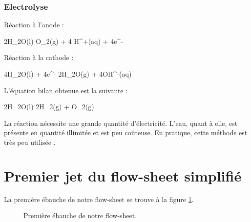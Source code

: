 \documentclass{article}
\begin{document}
		\subsubsection{Electrolyse}
		Réaction à l'anode : 
		
		\begin{chemmath}
			2H_2O(l) \longrightarrow O_2(g) + 4 H^+(aq) + 4e^-
		\end{chemmath}
		
		Réaction à la cathode :
		
		\begin{chemmath}
			4H_2O(l) + 4e^- \longrightarrow 2H_2O(g) + 4OH^-(aq)
		\end{chemmath}
		
		L'équation bilan obtenue est la suivante :
		
		\begin{chemmath}
			2H_2O(l) \longrightarrow 2H_2(g) + O_2(g)
		\end{chemmath}
		
	La réaction nécessite une grande quantité d'électricité. L'eau, quant à elle, est présente en quantité illimitée 
	et est peu coûteuse. En pratique, cette méthode est très peu utilisée \cite{wiki-h2}.
	
	\section{Premier jet du flow-sheet simplifié}
	La première ébauche de notre flow-sheet se trouve à la figure \ref{flow-sheet}.
	
	\begin{figure}[htb!]
		\centering
		\caption{Première ébauche de notre flow-sheet.}
		\label{flow-sheet}
	\end{figure}
	
\end{document}

